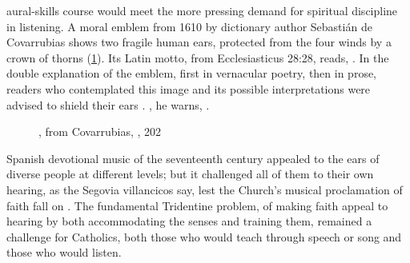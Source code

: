 aural-skills course would meet the more pressing demand for spiritual discipline
in listening.
A moral emblem from 1610 by dictionary author Sebastián de Covarrubias shows two
fragile human ears, protected from the four winds by a crown of thorns
(\cref{fig:Covarrubias-Emblemas-202-ears-thorns}).
Its Latin motto, from Ecclesiasticus 28:28, reads, .%
    \Autocite
    [202: .]
    {Covarrubias:Emblemas}
In the double explanation of the emblem, first in vernacular poetry, then in
prose, readers who contemplated this image and its possible interpretations were
advised to shield their ears .%
    \Autocite
    [203: .] 
    {Covarrubias:Emblemas}
, he warns, .%
    \Autocite
    [202: .] 
    {Covarrubias:Emblemas}

\begin{figure}
    \caption{, from Covarrubias,
    , 202}

    \label{fig:Covarrubias-Emblemas-202-ears-thorns}

\end{figure}

Spanish devotional music of the seventeenth century appealed to the ears of
diverse people at different levels; but it challenged all of them to
 their own hearing, as the Segovia villancicos say, lest the
Church's musical proclamation of faith fall on .
The fundamental Tridentine problem, of making faith appeal to hearing by both
accommodating the senses and training them, remained a challenge for Catholics,
both those who would teach through speech or song and those who would listen.


\endinput

